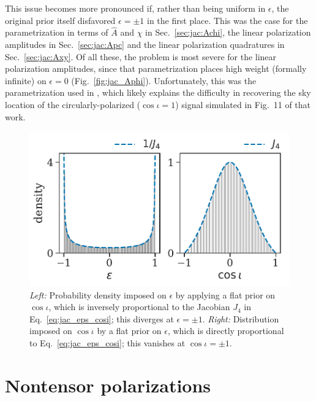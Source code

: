 \documentclass[aps,prd,twocolumn,superscriptaddress,preprintnumbers,floatfix,nofootinbib]{revtex4-2}
\newcommand*{\eq}[1]{Eq.~\eqref{eq:#1}}
\begin{document}
This issue becomes more pronounced if, rather than being uniform in $\epsilon$, the original prior itself disfavored $\epsilon = \pm 1$ in the first place.
This was the case for the parametrization in terms of $\hat{A}$ and $\chi$ in Sec.~\ref{sec:jac:Achi}, the linear polarization amplitudes in Sec.~\ref{sec:jac:Apc} and the linear polarization quadratures in Sec.~\ref{sec:jac:Axy}.
Of all these, the problem is most severe for the linear polarization amplitudes, since that parametrization places high weight (formally infinite) on $\epsilon = 0$ (Fig.~\ref{fig:jac_Aphi}).
Unfortunately, this was the parametrization used in \cite{Chatziioannou:2021mij}, which likely explains the difficulty in recovering the sky location of the circularly-polarized ($\cos\iota=1$) signal simulated in Fig.~11 of that work.

\begin{figure}
\includegraphics[width=\columnwidth]{jac_eps_cosi}
\caption{\emph{Left:} Probability density imposed on $\epsilon$ by applying a flat prior on $\cos\iota$, which is inversely proportional to the Jacobian $J_4$ in \eq{jac_eps_cosi}; this diverges at $\epsilon = \pm 1$.
\emph{Right:} Distribution imposed on $\cos\iota$ by a flat prior on $\epsilon$, which is directly proportional to \eq{jac_eps_cosi}; this vanishes at $\cos\iota = \pm 1$.
}
\label{fig:jac_cosi}
\end{figure}

\section{Nontensor polarizations}
\label{sec:nongr}

\newcommand{\xsym}{\ensuremath{x}}
\newcommand{\ysym}{{y}}
\newcommand{\bsym}{{b}}
\newcommand{\lsym}{{l}}
\newcommand{\hx}{h_{\xsym}}
\newcommand{\hy}{h_{\ysym}}
\newcommand{\hb}{h_{\bsym}}
\newcommand{\hlon}{h_{\lsym}}
\end{document}
